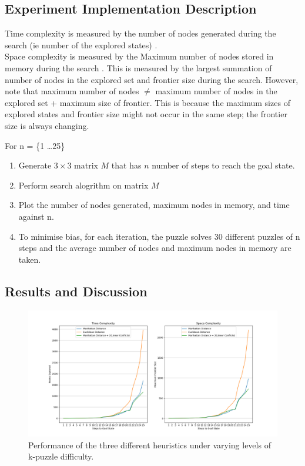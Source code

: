 \documentclass[runningheads]{llncs}
\begin{document}
\subsection{Experiment Implementation Description}
Time complexity is measured by the number of nodes generated during the search (ie number of the explored states) \cite[p80]{rosalind_euclidean_nodate}. \\
Space complexity is measured by the Maximum number of nodes stored in memory during the search \cite[p80]{stuart_russell_artifical_2010}. This is measured by the largest summation of number of nodes in the explored set and frontier size during the search. 
However, note that maximum number of nodes \( \neq \) maximum number of nodes in the explored set + maximum size of frontier. This is because the maximum sizes of explored states and frontier size might not occur in the same step; the frontier size is always changing.

For n = \{1 \dots 25\}
\begin{enumerate}
    \item Generate \(3 \times 3 \) matrix \( M \) that has \( n \) number of steps to reach the goal state.
    \item Perform search alogrithm on matrix \( M \)
    \item Plot the number of nodes generated, maximum nodes in memory, and time against n. %
    \item To minimise bias, for each iteration, the puzzle solves 30 different puzzles of n steps and the average number of nodes and maximum nodes in memory are taken.
\end{enumerate}

\subsection{Results and Discussion}
\begin{figure}
    \includegraphics[width=\textwidth]{fig1.png}
    \caption{Performance of the three different heuristics under varying levels of k-puzzle difficulty.} \label{fig1}
    \end{figure}
\end{document}
